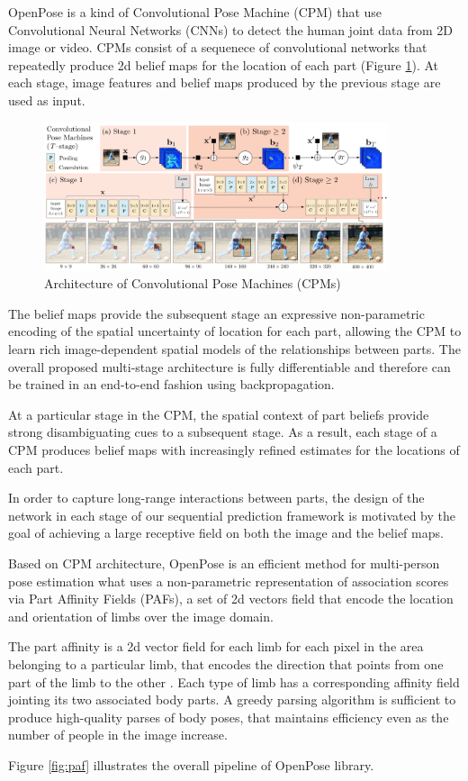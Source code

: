 \par OpenPose is a kind of Convolutional Pose Machine (CPM) that use Convolutional Neural Networks (CNNs) to detect the human joint data from 2D image or video. CPMs consist of a sequenece of convolutional networks that repeatedly produce 2d belief maps for the location of each part (Figure \ref{fig:eft}). At each stage, image features and belief maps produced by the previous stage are used as input.
\begin{figure}[htbp]
\centering\includegraphics[width=0.9\textwidth]{./img/eft.png}
\caption{Architecture of Convolutional Pose Machines (CPMs)}\label{fig:eft}
\end{figure}
\par The belief maps provide the subsequent stage an expressive non-parametric encoding of the spatial uncertainty of location for each part, allowing the CPM to learn rich image-dependent spatial models of the relationships between parts. The overall proposed multi-stage architecture is fully differentiable and therefore can be trained in an end-to-end fashion using backpropagation\cite{Wei2016}.
\par At a particular stage in the CPM, the spatial context of part beliefs provide strong disambiguating cues to a subsequent stage. As a result, each stage of a CPM produces belief maps with increasingly refined estimates for the locations of each part.
\par In order to capture long-range interactions between parts, the design of the network in each stage of our sequential prediction framework is motivated by the goal of achieving a large receptive field on both the image and the belief maps\cite{Wei2016}.
\par Based on CPM architecture, OpenPose is an efficient method for multi-person pose estimation what uses a non-parametric representation of association scores via Part Affinity Fields (PAFs), a set of 2d vectors field that encode the location and orientation of limbs over the image domain.
\par The part affinity is a 2d vector field for each limb for each pixel in the area belonging to a particular limb, that encodes the direction that points from one part of the limb to the other . Each type of limb has a corresponding affinity field jointing its two associated body parts. A greedy parsing algorithm is sufficient to produce high-quality parses of body poses, that maintains efficiency even as the number of people in the image increase\cite{cao2017realtime}.
\par Figure \ref{fig:paf} illustrates the overall pipeline of OpenPose library.

